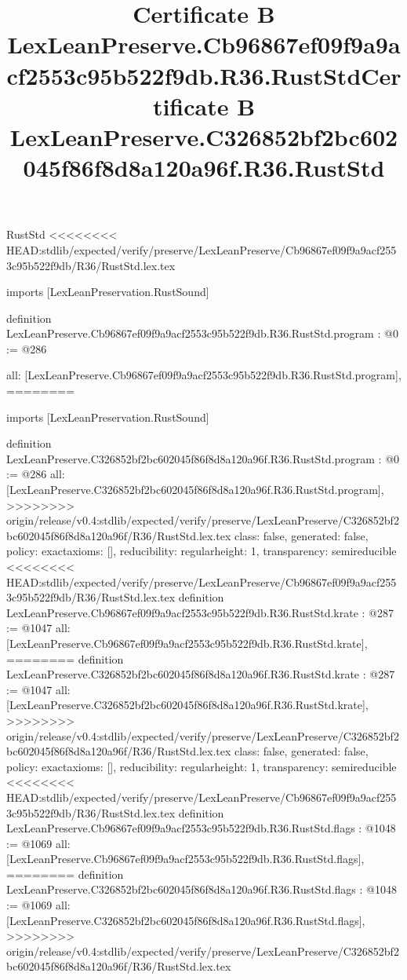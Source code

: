 \begin{lexlean}{RustStd}
<<<<<<<< HEAD:stdlib/expected/verify/preserve/LexLeanPreserve/Cb96867ef09f9a9acf2553c95b522f9db/R36/RustStd.lex.tex
\title{Certificate B LexLeanPreserve.Cb96867ef09f9a9acf2553c95b522f9db.R36.RustStd}
\begin{coremodule}
imports [LexLeanPreservation.RustSound]

definition LexLeanPreserve.Cb96867ef09f9a9acf2553c95b522f9db.R36.RustStd.program : @0 := @286 {
  all: [LexLeanPreserve.Cb96867ef09f9a9acf2553c95b522f9db.R36.RustStd.program],
========
\title{Certificate B LexLeanPreserve.C326852bf2bc602045f86f8d8a120a96f.R36.RustStd}
\begin{coremodule}
imports [LexLeanPreservation.RustSound]

definition LexLeanPreserve.C326852bf2bc602045f86f8d8a120a96f.R36.RustStd.program : @0 := @286 {
  all: [LexLeanPreserve.C326852bf2bc602045f86f8d8a120a96f.R36.RustStd.program],
>>>>>>>> origin/release/v0.4:stdlib/expected/verify/preserve/LexLeanPreserve/C326852bf2bc602045f86f8d8a120a96f/R36/RustStd.lex.tex
  class: false,
  generated: false,
  policy: exact{axioms: []},
  reducibility: regular{height: 1},
  transparency: semireducible
}
<<<<<<<< HEAD:stdlib/expected/verify/preserve/LexLeanPreserve/Cb96867ef09f9a9acf2553c95b522f9db/R36/RustStd.lex.tex
definition LexLeanPreserve.Cb96867ef09f9a9acf2553c95b522f9db.R36.RustStd.krate : @287 := @1047 {
  all: [LexLeanPreserve.Cb96867ef09f9a9acf2553c95b522f9db.R36.RustStd.krate],
========
definition LexLeanPreserve.C326852bf2bc602045f86f8d8a120a96f.R36.RustStd.krate : @287 := @1047 {
  all: [LexLeanPreserve.C326852bf2bc602045f86f8d8a120a96f.R36.RustStd.krate],
>>>>>>>> origin/release/v0.4:stdlib/expected/verify/preserve/LexLeanPreserve/C326852bf2bc602045f86f8d8a120a96f/R36/RustStd.lex.tex
  class: false,
  generated: false,
  policy: exact{axioms: []},
  reducibility: regular{height: 1},
  transparency: semireducible
}
<<<<<<<< HEAD:stdlib/expected/verify/preserve/LexLeanPreserve/Cb96867ef09f9a9acf2553c95b522f9db/R36/RustStd.lex.tex
definition LexLeanPreserve.Cb96867ef09f9a9acf2553c95b522f9db.R36.RustStd.flags : @1048 := @1069 {
  all: [LexLeanPreserve.Cb96867ef09f9a9acf2553c95b522f9db.R36.RustStd.flags],
========
definition LexLeanPreserve.C326852bf2bc602045f86f8d8a120a96f.R36.RustStd.flags : @1048 := @1069 {
  all: [LexLeanPreserve.C326852bf2bc602045f86f8d8a120a96f.R36.RustStd.flags],
>>>>>>>> origin/release/v0.4:stdlib/expected/verify/preserve/LexLeanPreserve/C326852bf2bc602045f86f8d8a120a96f/R36/RustStd.lex.tex
}}}
\end{coremodule}}
\end{coremodule}
\end{lexlean}
